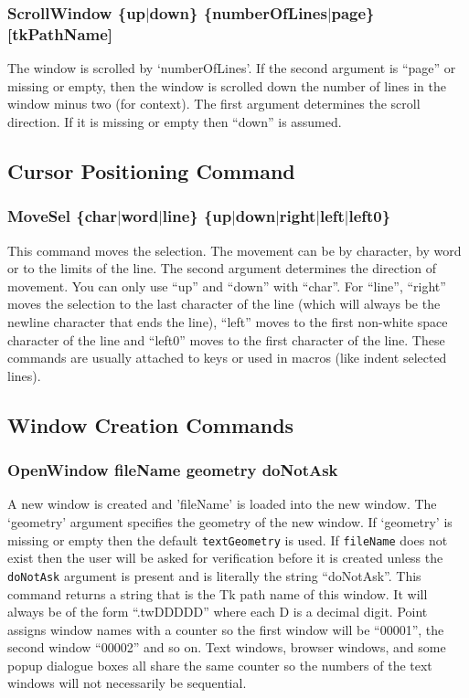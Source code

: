 \subsubsection{ScrollWindow \{up$\mid$down\} \{numberOfLines$\mid$page\}
		[tkPathName]}
The window is scrolled by `numberOfLines'.
If the second argument is ``page'' or missing or empty,
then the window is scrolled down the number of lines in
the window minus two (for context).
The first argument determines the scroll direction.
If it is missing or empty then ``down'' is assumed.




\subsection{Cursor Positioning Command}

\subsubsection{MoveSel \{char$\mid$word$\mid$line\}
		\{up$\mid$down$\mid$right$\mid$left$\mid$left0\}}
This command moves the selection.
The movement can be by character, by word or to the limits of the line.
The second argument determines the direction of movement.
You can only use ``up'' and ``down'' with ``char''.
For ``line'', ``right'' moves the selection to the last character
of the line (which will always be the newline character
that ends the line), ``left'' moves to the first non-white space
character of the line and ``left0'' moves to the first
character of the line.
These commands are usually attached to keys
or used in macros (like indent selected lines).





\subsection{Window Creation Commands}

\subsubsection{OpenWindow fileName geometry doNotAsk}
A new window is created and 'fileName' is loaded into the new window.
The `geometry' argument specifies the geometry of the new window.
If `geometry' is missing or empty then the default
{\tt textGeometry} is used.
If {\tt fileName} does not exist then the user will be asked
for verification before it is created unless the {\tt doNotAsk}
argument is present and is literally the string ``doNotAsk''.
This command returns a string that is the Tk path name
of this window.
It will always be of the form ``.twDDDDD'' where each D
is a decimal digit.
Point assigns window names with a counter so the first window
will be ``00001'', the second window ``00002'' and so on.
Text windows, browser windows, and some popup dialogue boxes
all share the same counter so the numbers of the text windows
will not necessarily be sequential.

